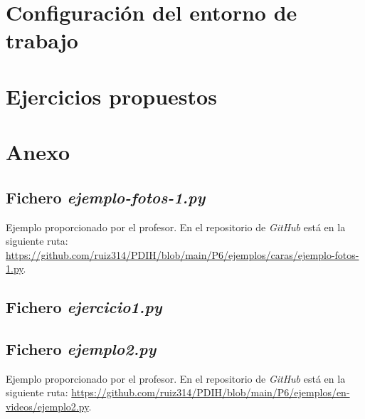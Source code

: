 \documentclass[a4paper]{article}
\begin{document}
\newpage
\section{Configuración del entorno de trabajo}\label{sec:Configuracion}

\newpage
\newpage
\section{Ejercicios propuestos}\label{sec:Ejercicios}





\newpage
\section{Anexo}\label{anexo:an}

\subsection{Fichero \textit{ejemplo-fotos-1.py}} \label{anexo:ejemplo} 
Ejemplo proporcionado por el profesor. En el repositorio de \textit{GitHub} está en la siguiente ruta: \url{https://github.com/ruiz314/PDIH/blob/main/P6/ejemplos/caras/ejemplo-fotos-1.py}.


\subsection{Fichero \textit{ejercicio1.py}} \label{anexo:ejer1} 


\subsection{Fichero \textit{ejemplo2.py}} \label{anexo:ejemplo2} 
Ejemplo proporcionado por el profesor. En el repositorio de \textit{GitHub} está en la siguiente ruta: \url{https://github.com/ruiz314/PDIH/blob/main/P6/ejemplos/en-videos/ejemplo2.py}.

\end{document}
